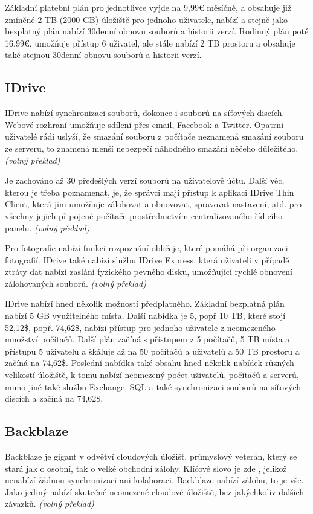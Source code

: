 \documentclass[
  glossaries,
]{kidiplom}
\begin{document}
Základní platební plán pro jednotlivce vyjde na 9,99€ měsíčně, a obsahuje již zmíněné 2 TB (2000 GB) úložiště pro jednoho uživatele, nabízí a stejně jako bezplatný plán nabízí 30denní obnovu souborů a historii verzí. Rodinný plán poté 16,99€, umožňuje přístup 6 uživatel, ale stále nabízí 2 TB prostoru a obsahuje také stejnou 30denní obnovu souborů a historii verzí. \cite{DROPBOXPRICE}

\subsection{IDrive}
IDrive nabízí synchronizaci souborů, dokonce i souborů na síťových discích. Webové rozhraní umožňuje sdílení přes email, Facebook a Twitter. Opatrní uživatelé rádi uslyší, že smazání souboru z počítače neznamená smazání souboru ze serveru, to znamená menší nebezpečí náhodného smazání něčeho důležitého. \cite{CLOUDSOLUTIONS} \textit {(volný překlad)}

Je zachováno až 30 předešlých verzí souborů na uživatelově účtu. Další věc, kterou je třeba poznamenat, je, že správci mají přístup k aplikaci IDrive Thin Client, která jim umožňuje zálohovat a obnovovat, spravovat nastavení, atd. pro všechny jejich připojené počítače prostřednictvím centralizovaného řídicího panelu. \cite{CLOUDSOLUTIONS} \textit {(volný překlad)}

Pro fotografie nabízí funkci rozpoznání obličeje, které pomáhá při organizaci fotografií. IDrive také nabízí službu IDrive Express, která uživateli v případě ztráty dat nabízí zaslání fyzického pevného disku, umožňující rychlé obnovení zálohovaných souborů. \cite{CLOUDSOLUTIONS} \textit {(volný překlad)}

IDrive nabízí hned několik možností předplatného. Základní bezplatná plán nabízí 5 GB využitelného místa. Další nabídka je 5, popř 10 TB, které stojí 52,12\$, popř. 74,62\$, nabízí přístup pro jednoho uživatele z neomezeného množství počítačů. Další plán začíná s přístupem z 5 počítačů, 5 TB místa a přístupu 5 uživatelů a škáluje až na 50 počítačů a uživatelů a 50 TB prostoru a začíná na 74,62\$. Poslední nabídka také obsahu hned několik nabídek různých velikostí úložiště, k tomu nabízí neomezený počet uživatelů, počítačů a serverů, mimo jiné také službu Exchange, SQL a také synchronizaci souborů na síťových discích a začíná na 74,62\$. \cite{IDRIVEPRICE}

\subsection{Backblaze}
Backblaze je gigant v odvětví cloudových úložišť, průmyslový veterán, který se stará jak o osobní, tak o velké obchodní zálohy. Klíčové slovo je zde , jelikož nenabízí žádnou synchronizaci ani kolaboraci. Backblaze nabízí zálohu, to je vše. Jako jediný nabízí skutečné neomezené cloudové úložiště, bez jakýchkoliv dalších závazků. \cite{CLOUDSOLUTIONS} \textit {(volný překlad)}
\end{document}
